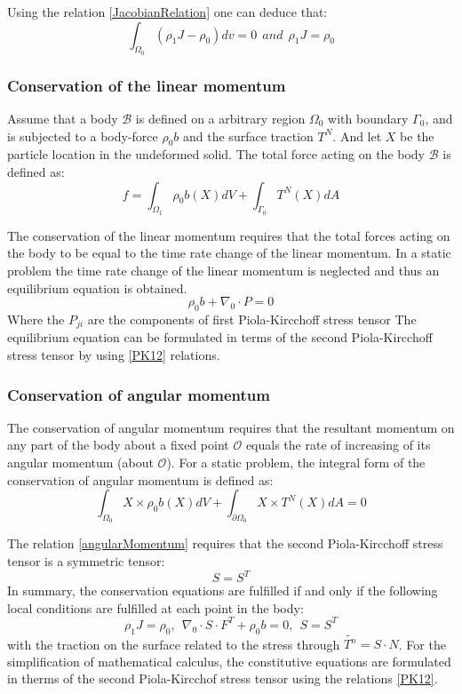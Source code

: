 Using the relation \ref{JacobianRelation} one can deduce that:
\begin{equation}
\int_{\Omega_0} \left( \rho_1 J - \rho_0\right)dv = 0 \  \ and \  \ \rho_1 J = \rho_0
\end{equation}
\subsubsection*{Conservation of the linear momentum}

Assume that a body $\mathcal{B}$ is defined on a arbitrary region $\Omega_0$ with boundary $\Gamma_0$, and is subjected to a body-force $\rho_0  b$ and the surface traction $T^N$. And let $X$ be the particle location in the undeformed solid.
 The total force acting on the body $\mathcal{B}$ is defined as:
\begin{equation}
f = \int_{\Omega_1}\rho_0 b(X)dV + \int_{\Gamma_0} T^N(X)dA
\end{equation}
 
The conservation of the linear momentum requires that the total forces acting on the body to be equal to the time rate change of the linear momentum. In a static problem the time rate change of the linear momentum is neglected and thus an equilibrium equation is obtained.
\begin{equation}
\rho_0 b+\nabla_0 \cdot P  = 0
\end{equation}
Where the $P_{ji}$ are the components of first Piola-Kircchoff stress tensor
The equilibrium equation can be formulated in terms of the second Piola-Kircchoff stress tensor by using \ref{PK12} relations.
\subsubsection*{Conservation of angular momentum}
The conservation of angular momentum requires that the resultant momentum on any part of the body about a fixed point $\mathcal{O}$ equals the rate of increasing of its angular momentum (about $\mathcal{O}$). For a static problem, the integral form of the conservation of angular momentum is defined as:
\begin{equation}
\label{angularMomentum}
\int_{\Omega_0} X \times \rho_0 b(X)dV + \int_{\partial \Omega_0} X \times  T^N(X)dA = 0
\end{equation}

The relation \ref{angularMomentum} requires that the second Piola-Kircchoff stress tensor is a symmetric tensor:
\begin{equation}
S = S^T
\end{equation}
In summary, the conservation equations are fulfilled if and only if the following local conditions are fulfilled at each point in the body:
\begin{equation}
\rho_1 J = \rho_0, \ \ \nabla_0 \cdot S \cdot F^T + \rho_0 b =0, \ \ S=S^T 
\end{equation}
with the traction on the surface related to the stress through $\tilde{T^n} = S \cdot N$.
 For the simplification of mathematical calculus, the constitutive equations are formulated in therms of the second Piola-Kircchof stress tensor using the relations \ref{PK12}.

